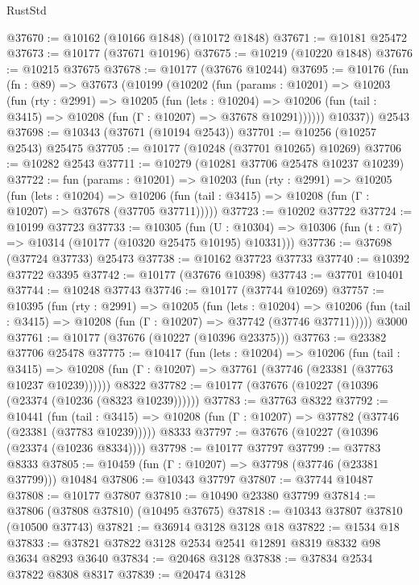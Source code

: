 \begin{lexlean}{RustStd}
\begin{coremodule}
@37670 := @10162 (@10166 @1848) (@10172 @1848)
@37671 := @10181 @25472
@37673 := @10177 (@37671 @10196)
@37675 := @10219 (@10220 @1848)
@37676 := @10215 @37675
@37678 := @10177 (@37676 @10244)
@37695 := @10176
    (fun (fn : @89) =>
    @37673
      (@10199
        (@10202
          (fun (params : @10201) =>
          @10203
            (fun (rty : @2991) =>
            @10205
              (fun (lets : @10204) =>
              @10206 (fun (tail : @3415) => @10208 (fun (Γ : @10207) => @37678 @10291))))))
        @10337))
    @2543
@37698 := @10343 (@37671 (@10194 @2543))
@37701 := @10256 (@10257 @2543) @25475
@37705 := @10177 (@10248 (@37701 @10265) @10269)
@37706 := @10282 @2543
@37711 := @10279 (@10281 @37706 @25478 @10237 @10239)
@37722 := fun (params : @10201) =>
  @10203
    (fun (rty : @2991) =>
    @10205
      (fun (lets : @10204) =>
      @10206 (fun (tail : @3415) => @10208 (fun (Γ : @10207) => @37678 (@37705 @37711)))))
@37723 := @10202 @37722
@37724 := @10199 @37723
@37733 := @10305
    (fun (U : @10304) => @10306 (fun (t : @7) => @10314 (@10177 (@10320 @25475 @10195) @10331)))
@37736 := @37698 (@37724 @37733) @25473
@37738 := @10162 @37723 @37733
@37740 := @10392 @37722 @3395
@37742 := @10177 (@37676 @10398)
@37743 := @37701 @10401
@37744 := @10248 @37743
@37746 := @10177 (@37744 @10269)
@37757 := @10395
    (fun (rty : @2991) =>
    @10205
      (fun (lets : @10204) =>
      @10206 (fun (tail : @3415) => @10208 (fun (Γ : @10207) => @37742 (@37746 @37711)))))
    @3000
@37761 := @10177 (@37676 (@10227 (@10396 @23375)))
@37763 := @23382 @37706 @25478
@37775 := @10417
    (fun (lets : @10204) =>
    @10206
      (fun (tail : @3415) =>
      @10208 (fun (Γ : @10207) => @37761 (@37746 (@23381 (@37763 @10237 @10239))))))
    @8322
@37782 := @10177 (@37676 (@10227 (@10396 (@23374 (@10236 (@8323 @10239))))))
@37783 := @37763 @8322
@37792 := @10441
    (fun (tail : @3415) => @10208 (fun (Γ : @10207) => @37782 (@37746 (@23381 (@37783 @10239)))))
    @8333
@37797 := @37676 (@10227 (@10396 (@23374 (@10236 @8334))))
@37798 := @10177 @37797
@37799 := @37783 @8333
@37805 := @10459 (fun (Γ : @10207) => @37798 (@37746 (@23381 @37799))) @10484
@37806 := @10343 @37797
@37807 := @37744 @10487
@37808 := @10177 @37807
@37810 := @10490 @23380 @37799
@37814 := @37806 (@37808 @37810) (@10495 @37675)
@37818 := @10343 @37807 @37810 (@10500 @37743)
@37821 := @36914 @3128 @3128 @18
@37822 := @1534 @18
@37833 := @37821 @37822 @3128 @2534 @2541 @12891 @8319 @8332 @98 @3634 @8293 @3640
@37834 := @20468 @3128
@37838 := @37834 @2534 @37822 @8308 @8317
@37839 := @20474 @3128

\end{coremodule}
\end{lexlean}
